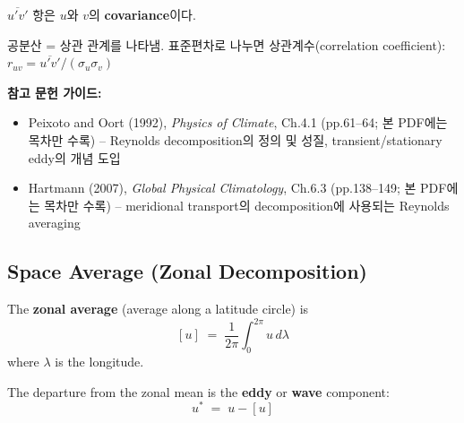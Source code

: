 \begin{remark}

  $\overline{u'v'}$ 항은 $u$와 $v$의 \textbf{covariance}이다.
  \begin{hisublock}
    공분산 = 상관 관계를 나타냄.
    표준편차로 나누면 상관계수(correlation coefficient):
    $r_{uv} = \overline{u'v'}/(\sigma_u \sigma_v)$
  \end{hisublock}
\end{remark}

\begin{hisublock}
\textbf{참고 문헌 가이드:}
\begin{itemize}
  \item Peixoto and Oort (1992), \textit{Physics of Climate}, Ch.4.1 (pp.61--64; 본 PDF에는 목차만 수록) -- Reynolds decomposition의 정의 및 성질, transient/stationary eddy의 개념 도입
  \item Hartmann (2007), \textit{Global Physical Climatology}, Ch.6.3 (pp.138--149; 본 PDF에는 목차만 수록) -- meridional transport의 decomposition에 사용되는 Reynolds averaging
\end{itemize}
\end{hisublock}

\subsection{Space Average (Zonal Decomposition)}

\begin{definition}

  The \textbf{zonal average} (average along a latitude circle) is
  \begin{equation}\label{eq:zonal-avg}
    [u] \;=\; \frac{1}{2\pi}\int_0^{2\pi} u\,d\lambda
  \end{equation}
  where $\lambda$ is the longitude.
\end{definition}

\begin{definition}

  The departure from the zonal mean is the \textbf{eddy} or \textbf{wave} component:
  \begin{equation}\label{eq:eddy}
    u^{*} \;=\; u - [u]
  \end{equation}
\end{definition}


